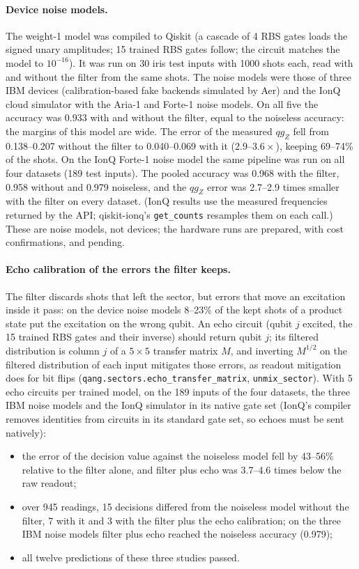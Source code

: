 \documentclass[11pt]{article}
\newcommand{\qZ}{qg_Z}
\begin{document}
\paragraph{Device noise models.} The weight-1 model was compiled to Qiskit (a cascade of 4 RBS gates loads
the signed unary amplitudes; 15 trained RBS gates follow; the circuit matches the model to $10^{-16}$). It
was run on 30 iris test inputs with 1000 shots each, read with and without the filter from the same shots.
The noise models were those of three IBM devices (calibration-based fake backends simulated by Aer) and
the IonQ cloud simulator with the Aria-1 and Forte-1 noise models. On all five the accuracy was 0.933 with
and without the filter, equal to the noiseless accuracy: the margins of this model are wide. The error of
the measured $\qZ$ fell from 0.138--0.207 without the filter to 0.040--0.069 with it ($2.9$--$3.6\times$),
keeping 69--74\% of the shots. On the IonQ Forte-1 noise model the same pipeline was run on all four datasets (189 test inputs). The
pooled accuracy was 0.968 with the filter, 0.958 without and 0.979 noiseless, and the $\qZ$ error was 2.7--2.9
times smaller with the filter on every dataset. (IonQ results use the measured frequencies returned by the
API; qiskit-ionq's \texttt{get\_counts} resamples them on each call.) These are noise models, not devices; the
hardware runs are prepared, with cost confirmations, and pending.

\paragraph{Echo calibration of the errors the filter keeps.}\label{sec:echo} The filter discards shots that left the
sector, but errors that move an excitation inside it pass: on the device noise models 8--23\% of the kept shots of a
product state put the excitation on the wrong qubit. An echo circuit (qubit $j$ excited, the 15 trained RBS gates and
their inverse) should return qubit $j$; its filtered distribution is column $j$ of a $5\times5$ transfer matrix $M$,
and inverting $M^{1/2}$ on the filtered distribution of each input mitigates those errors, as readout mitigation does
for bit flips (\texttt{qang.sectors.echo\_transfer\_matrix}, \texttt{unmix\_sector}). With 5 echo circuits per
trained model, on the 189 inputs of the four datasets, the three IBM noise models and the IonQ simulator in its
native gate set (IonQ's compiler removes identities from circuits in its standard gate set, so echoes must be sent
natively):
\begin{itemize}
\item the error of the decision value against the noiseless model fell by 43--56\% relative to the filter alone,
  and filter plus echo was 3.7--4.6 times below the raw readout;
\item over 945 readings, 15 decisions differed from the noiseless model without the filter, 7 with it and 3 with the
  filter plus the echo calibration; on the three IBM noise models filter plus echo reached the noiseless accuracy
  (0.979);
\item all twelve predictions of these three studies passed.
\end{itemize}
\end{document}
